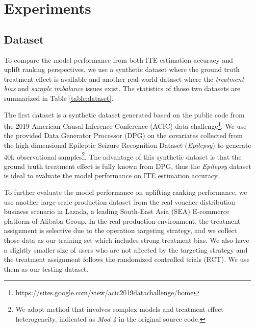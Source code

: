 \documentclass[sigconf]{acmart}
\begin{document}
\section{Experiments}
\subsection{Dataset}
To compare the model performance from both ITE estimation accuracy and uplift ranking perspectives, we use a synthetic dataset where the ground truth treatment effect is available and another real-world dataset where the \textit{treatment bias} and \textit{sample imbalance} issues exist. The statistics of those two datasets are summarized in Table \ref{table:dataset}.

The first dataset is a synthetic dataset generated based on the public code from the 2019 American Causal Inference Conference (ACIC) data challenge\footnote{https://sites.google.com/view/acic2019datachallenge/home}. We use the provided Data Generator Processor (DPG) on the covariates collected from the high dimensional Epileptic Seizure Recognition Dataset (\textit{Epilepsy}) \cite{Andrzejak2001} to generate 40k observational samples\footnote{We adopt method that involves complex models and treatment effect heterogeneity, indicated as \textit{Mod 4} in the original source code.}. The advantage of this synthetic dataset is that the ground truth treatment effect is fully known from DPG, thus the \textit{Epilepsy} dataset is ideal to evaluate the model performance on ITE estimation accuracy.

To further evaluate the model performance on uplifting ranking performance, we use another large-scale production dataset from the real voucher distribution business scenario in Lazada, a leading South-East Asia (SEA) E-commerce platform of Alibaba Group. In the real production environment, the treatment assignment is selective due to the operation targeting strategy, and we collect those data as our training set which includes strong treatment bias. We also have a slightly smaller size of users who are not affected by the targeting strategy and the treatment assignment follows the randomized controlled trials (RCT). We use them as our testing dataset. 
\end{document}
